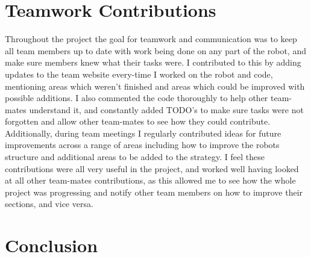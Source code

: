 \documentclass[12pt]{IEEEtran}
\begin{document}
\section{Teamwork Contributions}
Throughout the project the goal for teamwork and communication was to keep all team members up to date with work being done on any part of the robot, and make sure members knew what their tasks were. I contributed to this by adding updates to the team website every-time I worked on the robot and code, mentioning areas which weren't finished and areas which could be improved with possible additions. I also commented the code thoroughly to help other team-mates understand it, and constantly added TODO's to make sure tasks were not forgotten and allow other team-mates to see how they could contribute. Additionally, during team meetings I regularly contributed ideas for future improvements across a range of areas including how to improve the robots structure and additional areas to be added to the strategy. I feel these contributions were all very useful in the project, and worked well having looked at all other team-mates contributions, as this allowed me to see how the whole project was progressing and notify other team members on how to improve their sections, and vice versa.

\section{Conclusion}
\end{document}
